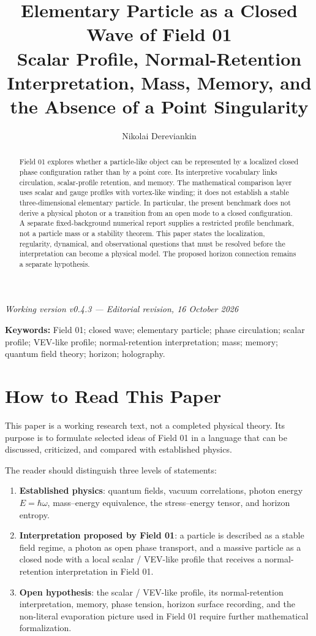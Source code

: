 \documentclass[11pt,a4paper]{article}
\title{Elementary Particle as a Closed Wave of Field 01\\\large Scalar Profile, Normal-Retention Interpretation, Mass, Memory, and the Absence of a Point Singularity}
\author{Nikolai Dereviankin}
\date{}
\begin{document}
\maketitle

\begin{center}
\textit{Working version v0.4.3 --- Editorial revision, 16 October 2026}
\end{center}

\begin{abstract}
Field 01 explores whether a particle-like object can be represented by a localized closed phase configuration rather than by a point core. Its interpretive vocabulary links circulation, scalar-profile retention, and memory. The mathematical comparison layer uses scalar and gauge profiles with vortex-like winding; it does not establish a stable three-dimensional elementary particle. In particular, the present benchmark does not derive a physical photon or a transition from an open mode to a closed configuration. A separate fixed-background numerical report supplies a restricted profile benchmark, not a particle mass or a stability theorem. This paper states the localization, regularity, dynamical, and observational questions that must be resolved before the interpretation can become a physical model. The proposed horizon connection remains a separate hypothesis.
\end{abstract}

\textbf{Keywords:} Field 01; closed wave; elementary particle; phase circulation; scalar profile; VEV-like profile; normal-retention interpretation; mass; memory; quantum field theory; horizon; holography.

\section{How to Read This Paper}

This paper is a working research text, not a completed physical theory. Its purpose is to formulate selected ideas of Field 01 in a language that can be discussed, criticized, and compared with established physics.

The reader should distinguish three levels of statements:
\begin{enumerate}
\item \textbf{Established physics}: quantum fields, vacuum correlations, photon energy $E=\hbar\omega$, mass--energy equivalence, the stress--energy tensor, and horizon entropy.
\item \textbf{Interpretation proposed by Field 01}: a particle is described as a stable field regime, a photon as open phase transport, and a massive particle as a closed node with a local scalar / VEV-like profile that receives a normal-retention interpretation in Field 01.
\item \textbf{Open hypothesis}: the scalar / VEV-like profile, its normal-retention interpretation, memory, phase tension, horizon surface recording, and the non-literal evaporation picture used in Field 01 require further mathematical formalization.
\end{enumerate}
\end{document}
